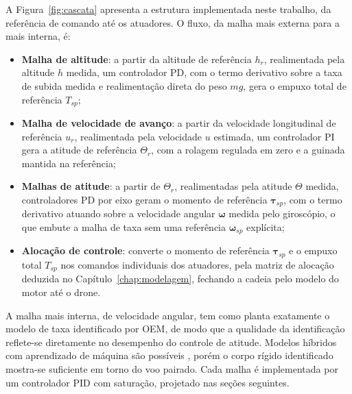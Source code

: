 {\color{blue}A Figura~\ref{fig:cascata} apresenta a estrutura implementada neste trabalho, da referência de comando até os atuadores. O fluxo, da malha mais externa para a mais interna, é:}
\begin{itemize}
    \item {\color{blue}\textbf{Malha de altitude}: a partir da altitude de referência $h_{r}$, realimentada pela altitude $h$ medida, um controlador PD, com o termo derivativo sobre a taxa de subida medida e realimentação direta do peso $mg$, gera o empuxo total de referência $T_{sp}$;}
    \item {\color{blue}\textbf{Malha de velocidade de avanço}: a partir da velocidade longitudinal de referência $u_{r}$, realimentada pela velocidade $u$ estimada, um controlador PI gera a atitude de referência $\Theta_{r}$, com a rolagem regulada em zero e a guinada mantida na referência;}
    \item {\color{blue}\textbf{Malhas de atitude}: a partir de $\Theta_{r}$, realimentadas pela atitude $\Theta$ medida, controladores PD por eixo geram o momento de referência $\boldsymbol{\tau}_{sp}$, com o termo derivativo atuando sobre a velocidade angular $\boldsymbol{\omega}$ medida pelo giroscópio, o que embute a malha de taxa sem uma referência $\boldsymbol{\omega}_{sp}$ explícita;}
    \item {\color{blue}\textbf{Alocação de controle}: converte o momento de referência $\boldsymbol{\tau}_{sp}$ e o empuxo total $T_{sp}$ nos comandos individuais dos atuadores, pela matriz de alocação deduzida no Capítulo~\ref{chap:modelagem}, fechando a cadeia pelo modelo do motor até o drone.}
\end{itemize}

{\color{blue}A malha mais interna, de velocidade angular, tem como planta exatamente o modelo de taxa identificado por OEM, de modo que a qualidade da identificação reflete-se diretamente no desempenho do controle de atitude. Modelos híbridos com aprendizado de máquina são possíveis \cite{Bauersfeld2021}, porém o corpo rígido identificado mostra-se suficiente em torno do voo pairado. Cada malha é implementada por um controlador PID com saturação, projetado nas seções seguintes.}

